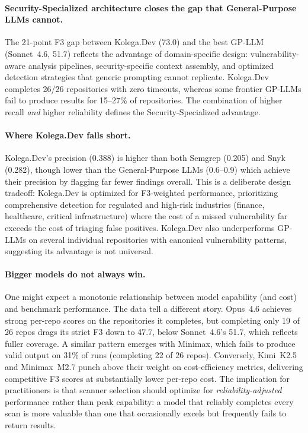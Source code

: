 \paragraph{Security-Specialized architecture closes the gap that General-Purpose LLMs cannot.}
The 21-point F3 gap between Kolega.Dev (73.0) and the best GP-LLM (Sonnet~4.6, 51.7) reflects the advantage of domain-specific design: vulnerability-aware analysis pipelines, security-specific context assembly, and optimized detection strategies that generic prompting cannot replicate. Kolega.Dev completes 26/26 repositories with zero timeouts, whereas some frontier GP-LLMs fail to produce results for 15--27\% of repositories. The combination of higher recall \emph{and} higher reliability defines the Security-Specialized advantage.

\paragraph{Where Kolega.Dev falls short.}
Kolega.Dev's precision (0.388) is higher than both Semgrep (0.205) and Snyk (0.282), though lower than the General-Purpose LLMs (0.6--0.9) which achieve their precision by flagging far fewer findings overall. This is a deliberate design tradeoff: Kolega.Dev is optimized for F3-weighted performance, prioritizing comprehensive detection for regulated and high-risk industries (finance, healthcare, critical infrastructure) where the cost of a missed vulnerability far exceeds the cost of triaging false positives. Kolega.Dev also underperforms GP-LLMs on several individual repositories with canonical vulnerability patterns, suggesting its advantage is not universal.

\paragraph{Bigger models do not always win.}
One might expect a monotonic relationship between model capability
(and cost) and benchmark performance.  The data tell a different
story.  Opus~4.6 achieves strong per-repo scores on the repositories
it completes, but completing only 19 of 26
repos drags its strict F3 down to 47.7, below Sonnet~4.6's 51.7,
which reflects fuller coverage.  A similar pattern emerges with
Minimax, which fails to produce valid output on 31\% of runs (completing 22 of 26 repos).  Conversely,
Kimi~K2.5 and Minimax~M2.7 punch above their weight on
cost-efficiency metrics, delivering competitive F3 scores at
substantially lower per-repo cost.  The implication for practitioners is
that scanner selection should optimize for \emph{reliability-adjusted}
performance rather than peak capability: a model that reliably completes
every scan is more valuable than one that occasionally excels but
frequently fails to return results.

